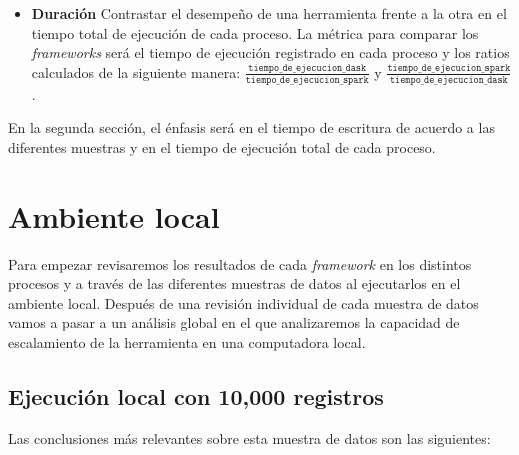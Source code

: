 \begin{itemize}
	\item \textbf{Duración} Contrastar el desempeño de una herramienta frente a la otra en el tiempo total de ejecución de cada proceso. La métrica para comparar los \textit{frameworks} será el tiempo de ejecución registrado en cada proceso y los ratios calculados de la siguiente manera: $\frac{\texttt{tiempo\_de\_ejecucion\_dask}}{\texttt{tiempo\_de\_ejecucion\_spark}}$ y $\frac{\texttt{tiempo\_de\_ejecucion\_spark}}{\texttt{tiempo\_de\_ejecucion\_dask}}$.
\end{itemize}

En la segunda sección, el énfasis será en el tiempo de escritura de acuerdo a las diferentes muestras y en el tiempo de ejecución total de cada proceso.

\newpage

\section{Ambiente local}
\label{section:resultados-ambiente-local}

Para empezar revisaremos los resultados de cada \textit{framework} en los distintos procesos y a través de las diferentes muestras de datos al ejecutarlos en el ambiente local. Después de una revisión individual de cada muestra de datos vamos a pasar a un análisis global en el que analizaremos la capacidad de escalamiento de la herramienta en una computadora local.

\subsection{Ejecución local con 10,000 registros}

Las conclusiones más relevantes sobre esta muestra de datos son las siguientes:

